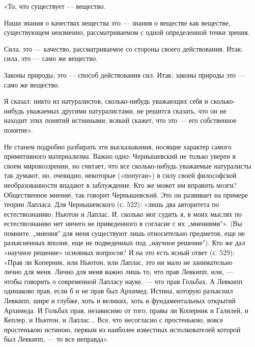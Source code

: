 «То, что существует --- вещество.

Наши  знания  о качествах  вещества  это  ---  знания о  веществе  как
веществе, существующем неизменно, рассматриваемом с одной определенной
точки зрения.

Сила,   это   ---   качество,  рассматриваемое   со   стороны   своего
действования. Итак: сила, это --- само же вещество.

Законы природы, это --- способ  действования сил. Итак: законы природы
это --- само же вещество.

Я  сказал:  никто из  натуралистов,  сколько-нибудь  уважающих себя  и
сколько-нибудь  уважаемых другими  натуралистами, не  решится сказать,
что он не  находит этих понятий истинными; всякий скажет,  что это ---
его собственное понятие».

Не станем подробно разбирать эти высказывания, носящие характер самого
примитивного материализма. Важно одно: Чернышевский не только уверен в
своем  мировоззрении, но  считает,  что  все сколько-нибудь  уважаемые
натуралисты  так думают,  но, очевидно,  некоторые («попугаи»)  в силу
своей философской необразованности впадают в заблуждение. Кто же может
им  вправить мозги?  Общественное  мнение,  так говорит  Чернышевский.
Это  он развивает  на примере  теории Лапласа.  Для Чернышевского  (с.
522):  «лишь два  авторитета по  естествознанию: Ньютон  и Лаплас.  И,
сколько мог  судить я, в моих  мыслях по естествознанию нет  ничего не
приведенного в  согласие с их  „мнениями"». (Вы помните,  „мнения" для
меня  существуют  лишь  относительно предметов,  еще  не  разъясненных
вполне, еще не подведенных под „научное решение"). Кто же дал «научное
решение» основных вопросов? И на это  есть ясный ответ (с. 529): «Прав
ли Коперник, или Ньютон, или Лаплас, это ни мало не занимательно лично
для меня.  Лично для меня  важно лишь то,  что прав Левкипп,  или, ---
чтобы говорить  о современной Лапласу  науке, --- что прав  Гольбах. А
Левкипп  одинаково  прав,  если  б  и не  прав  был  Архимед.  Истина,
которую  разъяснил Левкипп,  шире и  глубже,  хоть и  великих, хоть  и
фундаментальных открытий Архимеда. И Гольбах прав, независимо от того,
правы ли  Коперник и  Галилей, и  Кеплер, и  Ньютон, и  Лаплас... Все,
что  несогласно с  простенькою, вовсе  простенькою истиною,  первым из
наиболее  известных истолкователей  которой  был Левкипп,  --- то  все
неправда».

